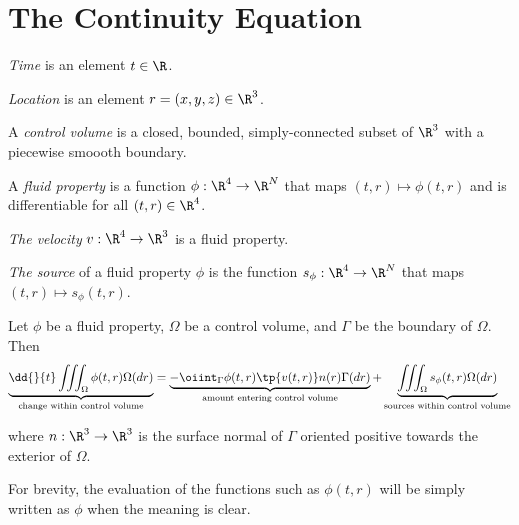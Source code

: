 \section{The Continuity Equation}

\begin{df}[Time]
    \emph{Time} is an element $t\in \R$.
\end{df}

\begin{df}[Location]
    \emph{Location} is an element $r=(x,y,z)\in \R^3$.
\end{df}

\begin{df}
    A \emph{control volume} is a closed, bounded,
    simply-connected subset of $\R^3$ with a piecewise smoooth boundary.
\end{df}

\begin{df}
A \emph{fluid property} is a function
$\phi:\R^4 \to \R^N$ that maps $(t,r)\mapsto \phi(t,r)$
and is differentiable for all $(t,r)\in \R^4$.
\end{df}

\begin{df}[Velocity]
\emph{The velocity} $v:\R^4\to \R^3$ is a fluid property.
\end{df}

\begin{df}
\emph{The source} of a fluid property $\phi$ is the function
$s_\phi:\R^4 \to \R^N$ that maps $(t,r)\mapsto s_\phi(t,r)$.
\end{df}

\begin{ax}
Let $\phi$ be a fluid property, $\Omega$ be a control volume, and
$\Gamma$ be the boundary of $\Omega$.  Then
    \begin{equation}
        \underbrace{\dd{}{t} \iiint_\Omega \phi(t,r) \Omega(dr)}_{\text{change within control volume}}
        =
        \underbrace{-\oiint_\Gamma \phi(t,r) \tp{v(t,r)} n(r) \Gamma(dr)}_{\text{amount entering control volume}}
        + \underbrace{\iiint_\Omega s_\phi(t,r) \Omega(dr)}_{\text{sources within control volume}}
    \end{equation}
\end{ax}
where $n:\R^3\to \R^3$ is the surface normal of $\Gamma$ oriented positive towards
the exterior of $\Omega$.

\begin{rk}
    For brevity, the evaluation of the functions such as $\phi(t,r)$ will be simply written
    as $\phi$ when the meaning is clear.
\end{rk}

